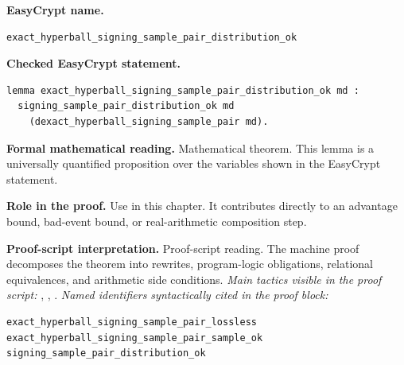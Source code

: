\begin{formaltheorem}
\noindent\textbf{EasyCrypt name.}
\begin{lstlisting}[language=EasyCrypt,basicstyle=\ttfamily\scriptsize]
exact_hyperball_signing_sample_pair_distribution_ok
\end{lstlisting}
\noindent\textbf{Checked EasyCrypt statement.}
\begin{lstlisting}[language=EasyCrypt,basicstyle=\ttfamily\scriptsize]
lemma exact_hyperball_signing_sample_pair_distribution_ok md :
  signing_sample_pair_distribution_ok md
    (dexact_hyperball_signing_sample_pair md).
\end{lstlisting}
\noindent\textbf{Formal mathematical reading.}
Mathematical theorem. This lemma is a universally quantified proposition over the variables shown in the EasyCrypt statement.

\noindent\textbf{Role in the proof.}
Use in this chapter. It contributes directly to an advantage bound, bad-event bound, or real-arithmetic composition step.

\noindent\textbf{Proof-script interpretation.}
Proof-script reading. The machine proof decomposes the theorem into rewrites, program-logic obligations, relational equivalences, and arithmetic side conditions.
\emph{Main tactics visible in the proof script:} , , .
\emph{Named identifiers syntactically cited in the proof block:}
\begin{lstlisting}[language=EasyCrypt,basicstyle=\ttfamily\scriptsize]
exact_hyperball_signing_sample_pair_lossless
exact_hyperball_signing_sample_pair_sample_ok
signing_sample_pair_distribution_ok
\end{lstlisting}

\end{formaltheorem}

